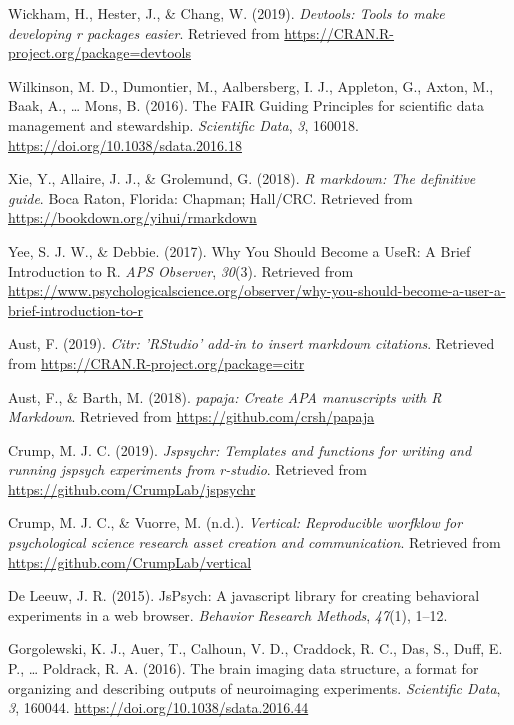 \documentclass[
  english,
  jou,floatsintext]{apa6}
\newlength{\cslhangindent}
\newenvironment{cslreferences}%
  {\setlength{\parindent}{0pt}%
  \everypar{\setlength{\hangindent}{\cslhangindent}}\ignorespaces}%
  {\par}
\begin{document}
\begin{cslreferences}
\leavevmode\hypertarget{ref-R-devtools}{}%
Wickham, H., Hester, J., \& Chang, W. (2019). \emph{Devtools: Tools to make developing r packages easier}. Retrieved from \url{https://CRAN.R-project.org/package=devtools}

\leavevmode\hypertarget{ref-WilkinsonFAIRGuidingPrinciples2016}{}%
Wilkinson, M. D., Dumontier, M., Aalbersberg, I. J., Appleton, G., Axton, M., Baak, A., \ldots{} Mons, B. (2016). The FAIR Guiding Principles for scientific data management and stewardship. \emph{Scientific Data}, \emph{3}, 160018. \url{https://doi.org/10.1038/sdata.2016.18}

\leavevmode\hypertarget{ref-R-rmarkdown}{}%
Xie, Y., Allaire, J. J., \& Grolemund, G. (2018). \emph{R markdown: The definitive guide}. Boca Raton, Florida: Chapman; Hall/CRC. Retrieved from \url{https://bookdown.org/yihui/rmarkdown}

\leavevmode\hypertarget{ref-yee_why_2017}{}%
Yee, S. J. W., \& Debbie. (2017). Why You Should Become a UseR: A Brief Introduction to R. \emph{APS Observer}, \emph{30}(3). Retrieved from \url{https://www.psychologicalscience.org/observer/why-you-should-become-a-user-a-brief-introduction-to-r}

\leavevmode\hypertarget{ref-R-citr}{}%
Aust, F. (2019). \emph{Citr: 'RStudio' add-in to insert markdown citations}. Retrieved from \url{https://CRAN.R-project.org/package=citr}

\leavevmode\hypertarget{ref-R-papaja}{}%
Aust, F., \& Barth, M. (2018). \emph{papaja: Create APA manuscripts with R Markdown}. Retrieved from \url{https://github.com/crsh/papaja}

\leavevmode\hypertarget{ref-R-jspsychr}{}%
Crump, M. J. C. (2019). \emph{Jspsychr: Templates and functions for writing and running jspsych experiments from r-studio}. Retrieved from \url{https://github.com/CrumpLab/jspsychr}

\leavevmode\hypertarget{ref-R-vertical}{}%
Crump, M. J. C., \& Vuorre, M. (n.d.). \emph{Vertical: Reproducible worfklow for psychological science research asset creation and communication}. Retrieved from \url{https://github.com/CrumpLab/vertical}

\leavevmode\hypertarget{ref-de2015jspsych}{}%
De Leeuw, J. R. (2015). JsPsych: A javascript library for creating behavioral experiments in a web browser. \emph{Behavior Research Methods}, \emph{47}(1), 1--12.

\leavevmode\hypertarget{ref-gorgolewski_brain_2016}{}%
Gorgolewski, K. J., Auer, T., Calhoun, V. D., Craddock, R. C., Das, S., Duff, E. P., \ldots{} Poldrack, R. A. (2016). The brain imaging data structure, a format for organizing and describing outputs of neuroimaging experiments. \emph{Scientific Data}, \emph{3}, 160044. \url{https://doi.org/10.1038/sdata.2016.44}


\end{cslreferences}
\end{document}
